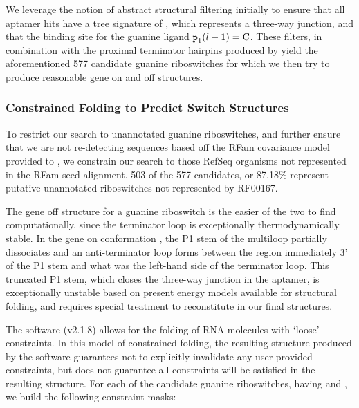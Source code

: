 We leverage the notion of abstract structural filtering initially to ensure that all \infernal aptamer hits have a tree signature of \ms{[0, 1, 2, 2]}, which represents a three-way junction, and that the binding site for the guanine ligand ${\text{\mbox{\tt p}}}_{\text{1}}(l - 1) = \text{C}$. These filters, in combination with the proximal terminator hairpins produced by \tthp yield the aforementioned 577 candidate guanine riboswitches for which we then try to produce reasonable gene on and off structures.

\subsubsection{Constrained Folding to Predict Switch Structures}
\label{subsubsec:rfinder:consfold}

To restrict our search to unannotated guanine riboswitches, and further ensure that we are not re-detecting sequences based off the RFam covariance model provided to \infernal, we constrain our search to those RefSeq organisms not represented in the RFam seed alignment. 503 of the 577 candidates, or 87.18\% represent putative unannotated riboswitches not represented by RF00167.

The gene off structure \strOff for a guanine riboswitch is the easier of the two to find computationally, since the terminator loop is exceptionally thermodynamically stable. In the gene on conformation \strOn, the P1 stem of the multiloop partially dissociates and an anti-terminator loop forms between the region immediately 3' of the P1 stem and what was the left-hand side of the terminator loop. This truncated P1 stem, which closes the three-way junction in the aptamer, is exceptionally unstable based on present energy models available for structural folding, and requires special treatment to reconstitute in our final structures.

The software \rfold (v2.1.8) allows for the folding of RNA molecules with `loose' constraints. In this model of constrained folding, the resulting structure produced by the software guarantees not to explicitly invalidate any user-provided constraints, but does not guarantee all constraints will be satisfied in the resulting structure. For each of the candidate guanine riboswitches, having \treeFor{\infernal} and \treeFor{\tthp}, we build the following constraint masks:

